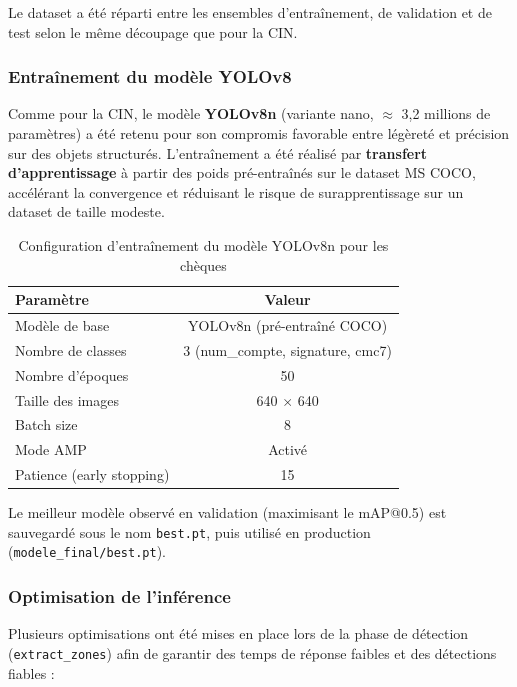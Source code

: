 Le dataset a été réparti entre les ensembles d'entraînement, de validation
et de test selon le même découpage que pour la CIN.

\subsubsection{Entraînement du modèle YOLOv8}

Comme pour la CIN, le modèle \textbf{YOLOv8n} (variante nano, $\approx$ 3,2
millions de paramètres) a été retenu pour son compromis favorable entre
légèreté et précision sur des objets structurés. L'entraînement a été
réalisé par \textbf{transfert d'apprentissage} à partir des poids
pré-entraînés sur le dataset MS COCO, accélérant la convergence et
réduisant le risque de surapprentissage sur un dataset de taille modeste.

\begin{table}[H]
\centering
\label{tab:yolo_cheque_training}
\begin{tabular}{|l|c|}
\hline
\textbf{Paramètre} & \textbf{Valeur} \\
\hline
Modèle de base        & YOLOv8n (pré-entraîné COCO) \\
Nombre de classes     & 3 (num\_compte, signature, cmc7) \\
Nombre d'époques      & 50 \\
Taille des images     & 640 $\times$ 640 \\
Batch size            & 8 \\
Mode AMP              & Activé \\
Patience (early stopping) & 15 \\
\hline
\end{tabular}
\caption{Configuration d'entraînement du modèle YOLOv8n pour les chèques}
\end{table}

Le meilleur modèle observé en validation (maximisant le mAP@0.5) est
sauvegardé sous le nom \texttt{best.pt}, puis utilisé en production
(\texttt{modele\_final/best.pt}).

\subsubsection{Optimisation de l'inférence}

Plusieurs optimisations ont été mises en place lors de la phase de
détection (\texttt{extract\_zones}) afin de garantir des temps de réponse
faibles et des détections fiables :

